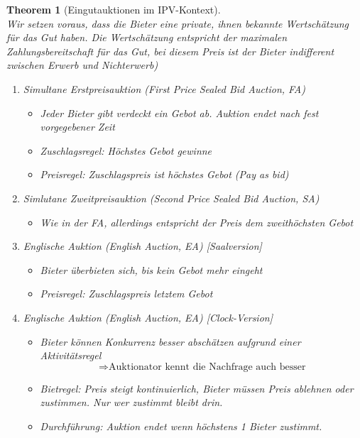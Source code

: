 \documentclass[12pt]{extreport} %
\theoremstyle{named}
\newtheorem*{unnamedtheorem*}{Theorem}
\theoremstyle{itshape}
\theoremstyle{normal}
\begin{document}
\newpage

\begin{unnamedtheorem*}[Eingutauktionen im IPV-Kontext] ~\\
Wir setzen voraus, dass die Bieter eine private, ihnen bekannte Wertschätzung für das Gut haben. Die Wertschätzung entspricht der maximalen Zahlungsbereitschaft für das Gut, bei diesem Preis ist der Bieter indifferent zwischen Erwerb und Nichterwerb)
	
	\begin{enumerate}
		\item Simultane Erstpreisauktion (First Price Sealed Bid Auction, FA)   
			\begin{itemize}
				\item Jeder Bieter gibt verdeckt ein Gebot ab. Auktion endet nach fest vorgegebener Zeit
				\item Zuschlagsregel: Höchstes Gebot gewinne
				\item Preisregel: Zuschlagspreis ist höchstes Gebot (Pay as bid)
			\end{itemize}
		\item Simlutane Zweitpreisauktion (Second Price Sealed Bid Auction, SA)   
			\begin{itemize}
				\item Wie in der FA, allerdings entspricht der Preis dem zweithöchsten Gebot
			\end{itemize}
		\item Englische Auktion (English Auction, EA) [Saalversion]   
			\begin{itemize}
				\item Bieter überbieten sich, bis kein Gebot mehr eingeht
				\item Preisregel: Zuschlagspreis letztem Gebot
			\end{itemize}
		\item Englische Auktion (English Auction, EA) [Clock-Version]
			\begin{itemize}
				\item Bieter können Konkurrenz besser abschätzen aufgrund einer Aktivitätsregel
					$$ \Rightarrow \text{Auktionator kennt die Nachfrage auch besser} $$
				\item Bietregel: Preis steigt kontinuierlich, Bieter müssen Preis ablehnen oder zustimmen. Nur wer zustimmt bleibt drin.
				\item Durchführung: Auktion endet wenn höchstens 1 Bieter zustimmt.

\end{itemize}
\end{enumerate}
\end{unnamedtheorem*}
\end{document}
